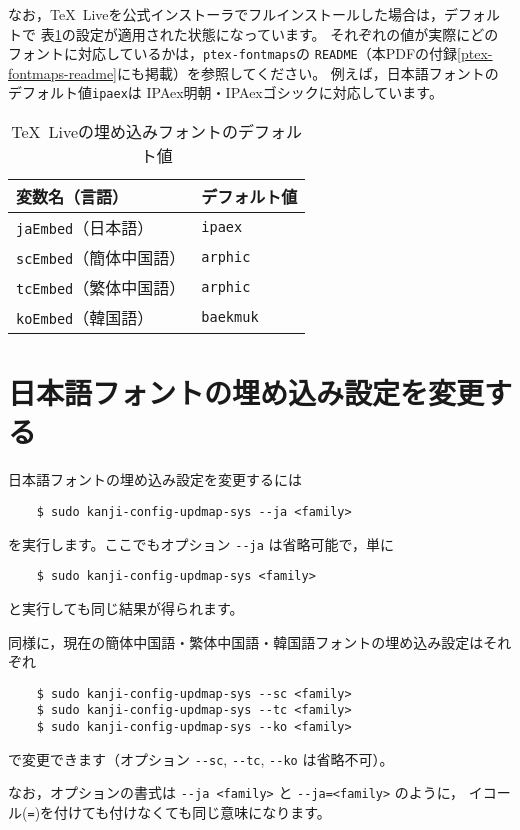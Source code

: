 \documentclass{jlreq}
\def\file#1{\texttt{#1}}
\def\command#1{\texttt{#1}}
\def\option#1{\texttt{-{}-#1}}
\def\TL{\TeX\ Live}
\begin{document}
なお，\TL を公式インストーラでフルインストールした場合は，デフォルトで
表\ref{tldefault}の設定が適用された状態になっています。
それぞれの値が実際にどのフォントに対応しているかは，\file{ptex-fontmaps}の
\file{README}（本PDFの付録\ref{ptex-fontmaps-readme}にも掲載）を参照してください。
例えば，日本語フォントのデフォルト値\command{ipaex}は
IPAex明朝・IPAexゴシックに対応しています。
\begin{table}[h]
  \centering
  \caption{\TL の埋め込みフォントのデフォルト値}\label{tldefault}
  \begin{tabular}{m{}m{}}
  \hline
  変数名（言語）                  & デフォルト値      \\ \hline
  \command{jaEmbed}（日本語）     & \command{ipaex}   \\
  \command{scEmbed}（簡体中国語） & \command{arphic}  \\
  \command{tcEmbed}（繁体中国語） & \command{arphic}  \\
  \command{koEmbed}（韓国語）     & \command{baekmuk} \\ \hline
\end{tabular}
\end{table}


\clearpage


\section{日本語フォントの埋め込み設定を変更する}

日本語フォントの埋め込み設定を変更するには
\begin{verbatim}
    $ sudo kanji-config-updmap-sys --ja <family>
\end{verbatim}
を実行します。ここでもオプション \option{ja} は省略可能で，単に
\begin{verbatim}
    $ sudo kanji-config-updmap-sys <family>
\end{verbatim}
と実行しても同じ結果が得られます。

同様に，現在の簡体中国語・繁体中国語・韓国語フォントの埋め込み設定はそれぞれ
\begin{verbatim}
    $ sudo kanji-config-updmap-sys --sc <family>
    $ sudo kanji-config-updmap-sys --tc <family>
    $ sudo kanji-config-updmap-sys --ko <family>
\end{verbatim}
で変更できます（オプション \option{sc}, \option{tc}, \option{ko} は省略不可）。

なお，オプションの書式は \option{ja <family>} と \option{ja=<family>} のように，
イコール(\command{=})を付けても付けなくても同じ意味になります。
\end{document}
